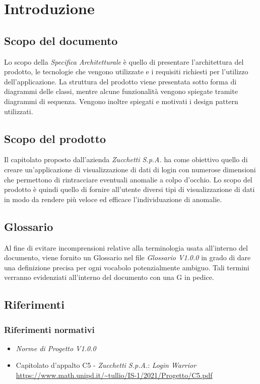 \chapter{Introduzione}

\section{Scopo del documento}
Lo scopo della \textit{Specifica Architetturale} è quello di presentare l’architettura del prodotto, le tecnologie che vengono utilizzate e i requisiti richiesti per l'utilizzo dell'applicazione.  La struttura del prodotto viene presentata sotto forma di diagrammi delle classi, mentre alcune funzionalità vengono spiegate tramite diagrammi di sequenza. Vengono inoltre spiegati e motivati i design pattern utilizzati.

\section{Scopo del prodotto}
Il capitolato proposto dall'azienda \textit{Zucchetti S.p.A.} ha come obiettivo quello di creare un'applicazione di visualizzazione di dati di login con numerose dimensioni che permettono
di rintracciare eventuali anomalie a colpo d'occhio. Lo scopo del prodotto è quindi quello di fornire all'utente diversi tipi di visualizzazione di dati in modo da rendere
più veloce ed efficace l'individuazione di anomalie.

\section{Glossario}
Al fine di evitare incomprensioni relative alla terminologia usata all'interno del documento, viene fornito un Glossario nel file \textit{Glossario V1.0.0} in grado di dare una definizione precisa per ogni vocabolo potenzialmente ambiguo. Tali termini verranno evidenziati all'interno del documento con una G in pedice.

\section{Riferimenti}
\subsection{Riferimenti normativi}
\begin{itemize}
    \item \textit{Norme di Progetto V1.0.0}
    \item Capitolato d'appalto C5 - \textit{Zucchetti S.p.A.}: \textit{Login Warrior} \\
    \url{https://www.math.unipd.it/~tullio/IS-1/2021/Progetto/C5.pdf}
\end{itemize}

